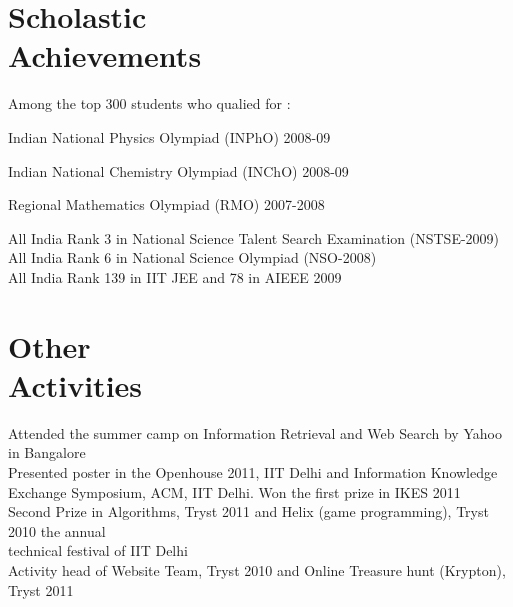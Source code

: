 \documentclass[margin,line]{resume}
\begin{document}
\begin{resume}
    \section{\mysidestyle Scholastic\\Achievements} 
    Among the top 300 students who qualied for :\vspace{1mm}\\\vspace{-4mm}
    \begin{list2}
	\item Indian National Physics Olympiad (INPhO) 2008-09
	\item Indian National Chemistry Olympiad (INChO) 2008-09
	\item Regional Mathematics Olympiad (RMO) 2007-2008
    \end{list2}\vspace{-1.5mm}
    All India Rank 3 in National Science Talent Search Examination (NSTSE-2009)\vspace{1mm}\\%
    All India Rank 6 in National Science Olympiad (NSO-2008)\vspace{1mm}\\%
    All India Rank 139 in IIT JEE and 78 in AIEEE 2009

    \section{\mysidestyle Other\\Activities}
    Attended the summer camp on Information Retrieval and Web Search by Yahoo in Bangalore\vspace{1mm}\\%
    Presented poster in the Openhouse 2011, IIT Delhi and Information Knowledge Exchange Symposium, ACM, IIT Delhi. Won the first prize in IKES 2011\vspace{1mm}\\%
    Second Prize in Algorithms, Tryst 2011 and Helix (game programming), Tryst 2010 the annual\\%
    technical festival of IIT Delhi\vspace{1mm}\\%
    Activity head of Website Team, Tryst 2010 and Online Treasure hunt (Krypton), Tryst 2011


\end{resume}
\end{document}
